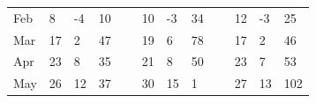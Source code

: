 \documentclass[agronomy,article,submit,moreauthors,pdftex,10pt,a4paper]{mdpi}
\theoremstyle{mdpi}
\theoremstyle{mdpidefinition}
\begin{document}
\begin{table}
\begin{tabular}{llllllllllll}
Feb                    & 8                                                                        & -4                                                                       & 10                                                                      & ~ & 10                                                                       & -3                                                                       & 34                                                                      & ~ & 12                                                                      & -3                                                                       & 25                                                                      \\
Mar                    & 17                                                                       & 2                                                                        & 47                                                                      & ~ & 19                                                                       & 6                                                                        & 78                                                                      & ~ & 17                                                                      & 2                                                                        & 46                                                                      \\
Apr                    & 23                                                                       & 8                                                                        & 35                                                                      & ~ & 21                                                                       & 8                                                                        & 50                                                                      & ~ & 23                                                                      & 7                                                                        & 53                                                                      \\
May                    & 26                                                                       & 12                                                                       & 37                                                                      & ~ & 30                                                                       & 15                                                                       & 1                                                                       & ~ & 27                                                                      & 13                                                                       & 102                                                                     \\

\end{tabular}
\end{table}
\end{document}
